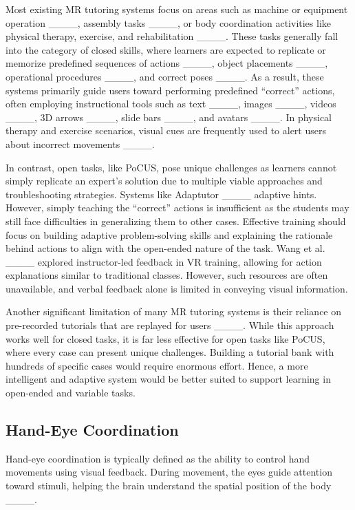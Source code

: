 Most existing MR tutoring systems focus on areas such as machine or equipment operation ____, assembly tasks ____, or body coordination activities like physical therapy, exercise, and rehabilitation ____. These tasks generally fall into the category of closed skills, where learners are expected to replicate or memorize predefined sequences of actions ____, object placements ____, operational procedures ____, and correct poses ____. As a result, these systems primarily guide users toward performing predefined ``correct'' actions, often employing instructional tools such as text ____, images ____, videos ____, 3D arrows ____, slide bars ____, and avatars ____. In physical therapy and exercise scenarios, visual cues are frequently used to alert users about incorrect movements ____. 

In contrast, open tasks, like PoCUS, pose unique challenges as learners cannot simply replicate an expert’s solution due to multiple viable approaches and troubleshooting strategies. Systems like Adaptutor ____ adaptive hints. However, simply teaching the ``correct'' actions is insufficient as the students may still face difficulties in generalizing them to other cases. Effective training should focus on building adaptive problem-solving skills and explaining the rationale behind actions to align with the open-ended nature of the task. Wang et al. ____ explored instructor-led feedback in VR training, allowing for action explanations similar to traditional classes. However, such resources are often unavailable, and verbal feedback alone is limited in conveying visual information.

Another significant limitation of many MR tutoring systems is their reliance on pre-recorded tutorials that are replayed for users ____. While this approach works well for closed tasks, it is far less effective for open tasks like PoCUS, where every case can present unique challenges. Building a tutorial bank with hundreds of specific cases would require enormous effort. Hence, a more intelligent and adaptive system would be better suited to support learning in open-ended and variable tasks.


\subsection{Hand-Eye Coordination}
Hand-eye coordination is typically defined as the ability to control hand movements using visual feedback. During movement, the eyes guide attention toward stimuli, helping the brain understand the spatial position of the body ____.

